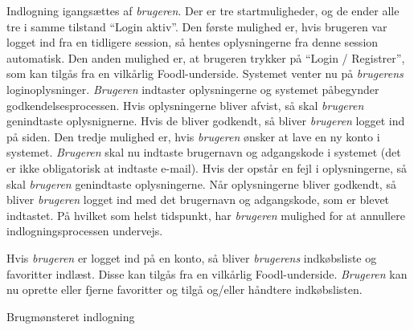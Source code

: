 {Indlogning igangsættes af \textit{brugeren}. Der er tre startmuligheder, og de ender alle tre i samme tilstand “Login aktiv”. Den første mulighed er, hvis brugeren var logget ind fra en tidligere session, så hentes oplysningerne fra denne session automatisk. Den anden mulighed er, at brugeren trykker på “Login / Registrer”, som kan tilgås fra en vilkårlig Foodl-underside. Systemet venter nu på \textit{brugerens} loginoplysninger. \textit{Brugeren} indtaster oplysningerne og systemet påbegynder godkendelsesprocessen. Hvis oplysningerne bliver afvist, så skal \textit{brugeren} genindtaste oplysnignerne. Hvis de bliver godkendt, så bliver \textit{brugeren} logget ind på siden. Den tredje mulighed er, hvis \textit{brugeren} ønsker at lave en ny konto i systemet. \textit{Brugeren} skal nu indtaste brugernavn og adgangskode i systemet (det er ikke obligatorisk at indtaste e-mail). Hvis der opstår en fejl i oplysningerne, så skal \textit{brugeren} genindtaste oplysningerne. Når oplysningerne bliver godkendt, så bliver \textit{brugeren} logget ind med det brugernavn og adgangskode, som er blevet indtastet. På hvilket som helst tidspunkt, har \textit{brugeren} mulighed for at annullere indlogningsprocessen undervejs.

Hvis \textit{brugeren} er logget ind på en konto, så bliver \textit{brugerens} indkøbsliste og favoritter indlæst. Disse kan tilgås fra en vilkårlig Foodl-underside. \textit{Brugeren} kan nu oprette eller fjerne favoritter og tilgå og/eller håndtere indkøbslisten.}
{}
{}
{Brugmønsteret indlogning}